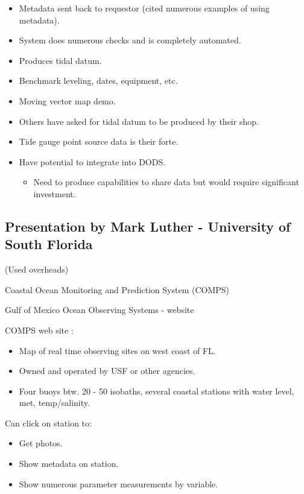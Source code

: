 \begin{itemize}
\item Metadata sent back to requestor (cited numerous examples of using metadata). 

\item System does numerous checks and is completely automated.

\item Produces tidal datum.

\item Benchmark leveling, dates, equipment, etc.

\item Moving vector map demo.

\item Others have asked for tidal datum to be produced by their shop.

\item Tide gauge point source data is their forte.

\item Have potential to integrate into DODS.
\begin{itemize}
\item Need to produce capabilities to share data but would require significant investment.
\end{itemize}
\end{itemize}


\subsection{Presentation by Mark Luther - University of South Florida}

(Used overheads)

Coastal Ocean Monitoring and Prediction System (COMPS)

Gulf of Mexico Ocean Observing Systems - website

COMPS web site  :
\begin{itemize}
\item Map of real time observing sites on west coast of FL.
\item Owned and operated by USF or other agencies.
\item Four buoys btw. 20 - 50 isobaths, several coastal stations with water level, met, 
temp/salinity.
\end{itemize}

Can click on station to:
\begin{itemize}
\item Get photos.
\item Show metadata on station.
\item Show numerous parameter measurements by variable.
\end{itemize}

